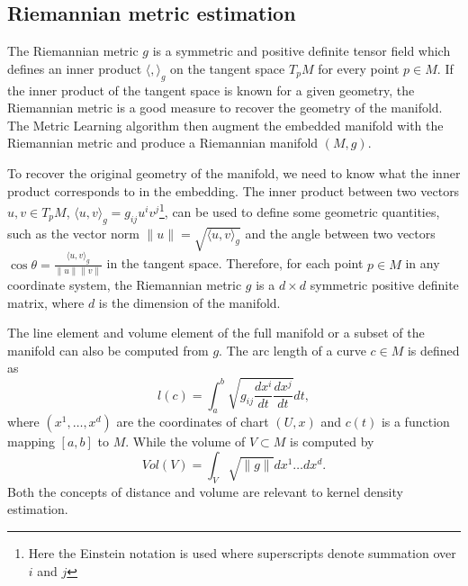 \documentclass[11pt,a4paper,]{article}
\begin{document}
\hypertarget{riemannian-metric-estimation}{%
\subsection{Riemannian metric estimation}\label{riemannian-metric-estimation}}

The Riemannian metric \(g\) is a symmetric and positive definite tensor field which defines an inner product \(\langle,\rangle_g\) on the tangent space \(T_pM\) for every point \(p \in M\). If the inner product of the tangent space is known for a given geometry, the Riemannian metric is a good measure to recover the geometry of the manifold. The Metric Learning algorithm \autocite{Perrault-Joncas2013-pq} then augment the embedded manifold with the Riemannian metric and produce a Riemannian manifold \((M, g)\).

To recover the original geometry of the manifold, we need to know what the inner product corresponds to in the embedding. The inner product between two vectors \(u,v \in T_pM\), \(\langle u,v \rangle_g=g_{ij}u^iv^j\)\footnote{Here the Einstein notation is used where superscripts denote summation over \(i\) and \(j\)}, can be used to define some geometric quantities, such as the vector norm \(\|u\|=\sqrt{\langle u,v \rangle_g}\) and the angle between two vectors \(\cos{\theta}=\frac{\langle u,v \rangle_g}{\|u\|\|v\|}\) in the tangent space.
Therefore, for each point \(p\in M\) in any coordinate system, the Riemannian metric \(g\) is a \(d\times d\) symmetric positive definite matrix, where \(d\) is the dimension of the manifold.

The line element and volume element of the full manifold or a subset of the manifold can also be computed from \(g\). The arc length of a curve \(c\in M\) is defined as
\[
l(c)=\int_a^b \sqrt{g_{ij} \frac{dx^i}{dt} \frac{dx^j}{dt}} dt,
\]
where \((x^1,\dots,x^d)\) are the coordinates of chart \((U,x)\) and \(c(t)\) is a function mapping \([a,b]\) to \(M\). While the volume of \(V\subset M\) is computed by
\[
Vol(V)=\int_V \sqrt{\|g\|} dx^1\dots dx^d.
\]
Both the concepts of distance and volume are relevant to kernel density estimation.
\end{document}
